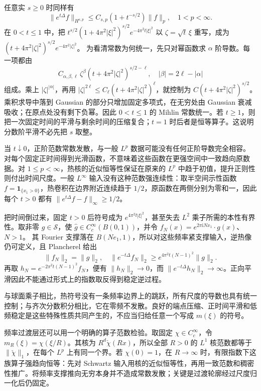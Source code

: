 \ProseParagraphBreak

任意实 \(s\geq0\) 时同样有
\[
 \|e^{t\Delta}f\|_{H^{s,p}}\leq C_{s,p}(1+t^{-s/2})\|f\|_p,
 \quad1<p<\infty.
\]
在 \(0<t\leq1\) 中，把 \(t^{s/2}(1+4\pi^2|\xi|^2)^{s/2}e^{-4\pi^2t|\xi|^2}\) 以 \(\zeta=\sqrt t\,\xi\) 重写，成为
\((t+4\pi^2|\zeta|^2)^{s/2}e^{-4\pi^2|\zeta|^2}\)。
为看清常数为何统一，先只对幂函数求 \(\alpha\) 阶导数。每一项都由
\[
 C_{\alpha,\beta,\ell}\,
 \zeta^\beta(t+4\pi^2|\zeta|^2)^{s/2-\ell},
 \quad |\beta|=2\ell-|\alpha|
\]
组成。乘上 \(|\zeta|^{|\alpha|}\)，再用
\(|\zeta|^{2\ell}\leq C_\ell(t+4\pi^2|\zeta|^2)^\ell\)，就控制为
\(C(t+4\pi^2|\zeta|^2)^{s/2}\)。乘积求导中落到 Gaussian 的部分只增加固定多项式，在无穷处由 Gaussian 衰减吸收；在原点处没有剩下负幂。因此 \(0<t\leq1\) 的 Mihlin 常数统一。若 \(t\geq1\)，则把一次固定时间的平滑与剩余时间的压缩复合；\(t=1\) 时后者是恒等算子。这说明分数阶平滑不必先把 \(s\) 取整。

\ProseParagraphBreak

当 \(t\downarrow0\)，正阶范数常数发散，与一般 \(L^p\) 数据可能没有任何正阶导数完全相容。对每个固定正时间得到光滑函数，不意味着这些函数在更强空间中一致趋向原数据。对 \(1\leq p<\infty\)，热核的近似恒等性保证在原来的 \(L^p\) 中趋于初值，提升正则性则付出时间尺度。一般 \(L^\infty\) 输入没有这种范数强连续性：取半空间示性函数 \(f=\mathbf1_{\{x_1>0\}}\)，热卷积在边界附近连续趋于 \(1/2\)，原函数在两侧分别为零和一，因此每个 \(t>0\) 都有 \(\|e^{t\Delta}f-f\|_\infty\geq1/2\)。

\ProseParagraphBreak

把时间倒过来，固定 \(t>0\) 后符号成为 \(e^{4\pi^2t|\xi|^2}\)，甚至失去 \(L^2\) 乘子所需的本性有界性。取非零 \(g\in\mathcal S\)，使
\(\widehat g\in C_c^\infty(B(0,1))\)，并令
\(f_N(x)=e^{2\pi\mathrm iNx_1}\cdot g(x)\)、\(N>1\)。
其 Fourier 支撑落在 \(B(Ne_1,1)\)，所以对这些频率紧支撑输入，逆热像仍可定义，且 Plancherel 给出
\[
 \|f_N\|_2=\|g\|_2,\quad
 \|e^{-t\Delta}f_N\|_2
 \geq e^{4\pi^2t(N-1)^2}\|g\|_2.
\]
再取 \(h_N=e^{-2\pi^2t(N-1)^2}f_N\)，便有 \(\|h_N\|_2\to0\)，而
\(\|e^{-t\Delta}h_N\|_2\to\infty\)。正向平滑因此不能通过形式上的指数取反得到稳定逆过程。

\ProseParagraphBreak

与球面乘子相比，热符号没有一条频率边界上的跳跃，所有尺度的导数也具有统一控制；与齐次分数积分相比，它在零频不发散。良好的端点压缩、正时间平滑和低频稳定是这些特殊性质共同产生的，不应当归给任意一个写成 \(m(\xi)\) 的符号。

\ProseParagraphBreak

频率过渡层还可以用一个明确的算子范数检验。取固定 \(\chi\in C_c^\infty\)，令 \(m_R(\xi)=\chi(\xi/R)\)。其核为 \(R^d\check\chi(Rx)\)，所以全部 \(R>0\) 的 \(L^1\) 核范数都等于 \(\|\check\chi\|_1\)，在每个 \(L^p\) 上有同一个界。若 \(\chi(0)=1\)，在 \(R\to\infty\) 时，有限指数下这族算子强趋向恒等：先对 Schwartz 输入用核的近似恒等性，再用一致范数和稠密性推广。将频率支撑推向无穷本身并不造成常数发散；关键是过渡轮廓经过尺度归一化后仍固定。

